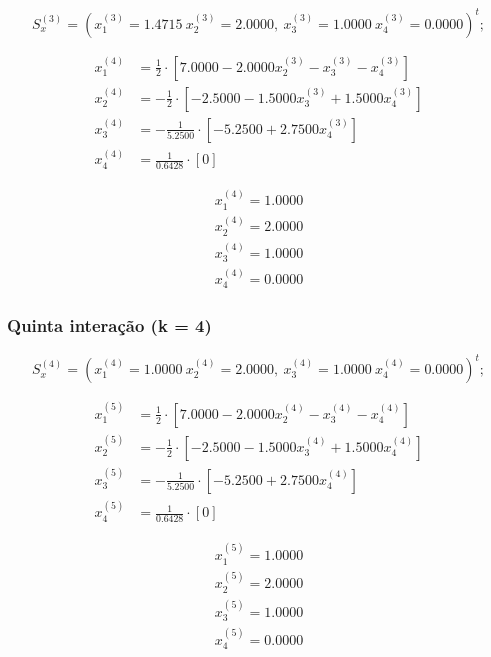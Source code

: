 \documentclass[12pt]{article}
\begin{document}
                \[
                S_x^{(3)} = (x_1^{(3)} = 1.4715\ x_2^{(3)}= 2.0000,\ x_3^{(3)}= 1.0000\ x_4^{(3)}= 0.0000)^t;
                \]

                \begin{align*}
                    x_1^{(4)} &= \frac{1}{2} \cdot [7.0000 - 2.0000x_2^{(3)} - x_3^{(3)} - x_4^{(3)}]\\
                    x_2^{(4)} &= -\frac{1}{2} \cdot [-2.5000 - 1.5000x_3^{(3)} + 1.5000x_4^{(3)}]\\
                    x_3^{(4)} &= -\frac{1}{5.2500} \cdot [-5.2500 + 2.7500x_4^{(3)}]\\
                    x_4^{(4)} &= \frac{1}{0.6428} \cdot [0]
                \end{align*}

                \begin{align*}
                    x_1^{(4)} = 1.0000\\ x_2^{(4)}= 2.0000\\ x_3^{(4)}= 1.0000\\ x_4^{(4)}= 0.0000
                \end{align*}

            \subsubsection{Quinta interação (k = 4)}

                \[
                S_x^{(4)} = (x_1^{(4)} = 1.0000\ x_2^{(4)}= 2.0000,\ x_3^{(4)}= 1.0000\ x_4^{(4)}= 0.0000)^t;
                \]

                \begin{align*}
                    x_1^{(5)} &= \frac{1}{2} \cdot [7.0000 - 2.0000x_2^{(4)} - x_3^{(4)} - x_4^{(4)}]\\
                    x_2^{(5)} &= -\frac{1}{2} \cdot [-2.5000 - 1.5000x_3^{(4)} + 1.5000x_4^{(4)}]\\
                    x_3^{(5)} &= -\frac{1}{5.2500} \cdot [-5.2500 + 2.7500x_4^{(4)}]\\
                    x_4^{(5)} &= \frac{1}{0.6428} \cdot [0]
                \end{align*}

                \begin{align*}
                    x_1^{(5)} = 1.0000\\ x_2^{(5)}= 2.0000\\ x_3^{(5)}= 1.0000\\ x_4^{(5)}= 0.0000
                \end{align*}
\end{document}
